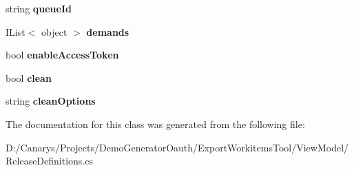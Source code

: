 \begin{DoxyCompactItemize}
string {\bfseries queue\+Id}
\item 
\mbox{\label{class_templates_generator_tool_1_1_view_model_1_1_release_definitions_1_1_deployment_input_a38f9b28752712fe37e18222397a7ff3d}} 
I\+List$<$ object $>$ {\bfseries demands}
\item 
\mbox{\label{class_templates_generator_tool_1_1_view_model_1_1_release_definitions_1_1_deployment_input_a099db4a0d295f34fb66f6e39b17104f8}} 
bool {\bfseries enable\+Access\+Token}
\item 
\mbox{\label{class_templates_generator_tool_1_1_view_model_1_1_release_definitions_1_1_deployment_input_a76f770683ae929d99c4dbb543bc7b8cf}} 
bool {\bfseries clean}
\item 
\mbox{\label{class_templates_generator_tool_1_1_view_model_1_1_release_definitions_1_1_deployment_input_affd076196a5cd0099dfbc5a42d012596}} 
string {\bfseries clean\+Options}
\end{DoxyCompactItemize}


The documentation for this class was generated from the following file\+:\begin{DoxyCompactItemize}
\item 
D\+:/\+Canarys/\+Projects/\+Demo\+Generator\+Oauth/\+Export\+Workitems\+Tool/\+View\+Model/Release\+Definitions.\+cs\end{DoxyCompactItemize}
